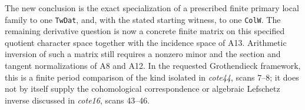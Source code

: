 The new conclusion is the exact specialization of a prescribed finite
primary local family to one \texttt{TwDat}, and, with the stated
starting witness, to one \texttt{ColW}.  The remaining derivative
question is now a concrete finite matrix on this specified quotient
character space together with the incidence space of A13.  Arithmetic
inversion of such a matrix still requires a nonzero minor and the
section and tangent normalizations of A8 and A12.  In the requested
Grothendieck framework, this is a finite period comparison of the
kind isolated in \emph{cote44}, scans 7--8; it does not by itself
supply the cohomological correspondence or algebraic Lefschetz
inverse discussed in \emph{cote16}, scans 43--46.
